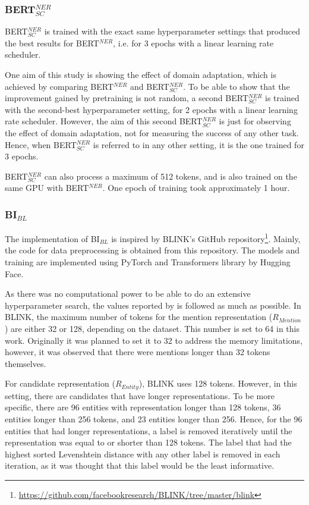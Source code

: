 \documentclass{report}
\theoremstyle{definition}
\theoremstyle{remark}
\begin{document}
\subsubsection{BERT$^{NER}_{SC}$}
BERT$^{NER}_{SC}$ is trained with the exact same hyperparameter settings that produced the best results for BERT$^{NER}$, i.e. for 3 epochs with a linear learning rate scheduler.

One aim of this study is showing the effect of domain adaptation, which is achieved by comparing BERT$^{NER}$ and BERT$^{NER}_{SC}$. To be able to show that the improvement gained by pretraining is not random, a second BERT$^{NER}_{SC}$ is trained with the second-best hyperparameter setting, for 2 epochs with a linear learning rate scheduler. However, the aim of this second BERT$^{NER}_{SC}$ is just for observing the effect of domain adaptation, not for measuring the success of any other task. Hence, when BERT$^{NER}_{SC}$ is referred to in any other setting, it is the one trained for 3 epochs.

BERT$^{NER}_{SC}$ can also process a maximum of 512 tokens, and is also trained on the same GPU with BERT$^{NER}$. One epoch of training took approximately 1 hour.
\subsubsection{BI$_{BL}$}
The implementation of BI$_{BL}$ is inspired by BLINK's GitHub repository\footnote{\url{https://github.com/facebookresearch/BLINK/tree/master/blink}}. Mainly, the code for data preprocessing is obtained from this repository. The models and training are implemented using PyTorch \cite{pytorch} and Transformers library by Hugging Face.

As there was no computational power to be able to do an extensive hyperparameter search, the values reported by \cite{scalablezeroshot} is followed as much as possible. In BLINK, the maximum number of tokens for the mention representation ($R_{Mention}$) are either 32 or 128, depending on the dataset. This number is set to 64 in this work. Originally it was planned to set it to 32 to address the memory limitations, however, it was observed that there were mentions longer than 32 tokens themselves.

For candidate representation ($R_{Entity}$), BLINK uses 128 tokens. However, in this setting, there are candidates that have longer representations. To be more specific, there are 96 entities with representation longer than 128 tokens, 36 entities longer than 256 tokens, and 23 entities longer than 256. Hence, for the 96 entities that had longer representations, a label is removed iteratively until the representation was equal to or shorter than 128 tokens. The label that had the highest sorted Levenshtein distance with any other label is removed in each iteration, as it was thought that this label would be the least informative.
\end{document}
